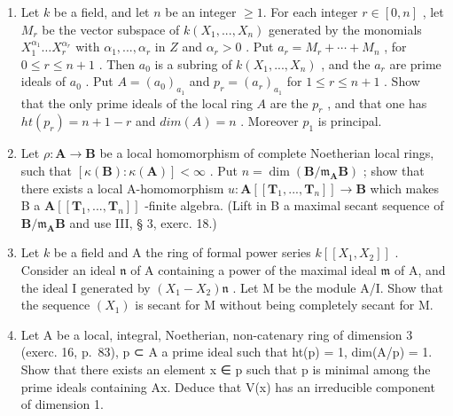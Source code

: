\begin{enumerate}
\def\labelenumi{\arabic{enumi})}
\setcounter{enumi}{3}
\item
  Let \(k\) be a field, and let \(n\) be an integer \(\geqslant 1\). For each integer \(r \in [0, n]\) , let \(M_r\) be the vector subspace of \(k(X_1, ..., X_n)\) generated by the monomials \(X_1^{\alpha_1}\ldots X_r^{\alpha_r}\) with \(\alpha_1, ..., \alpha_r\) in \(Z\) and \(\alpha_r > 0\) . Put \(a_r = M_r + \cdots + M_n\) , for \(0 \leqslant r \leqslant n + 1\) . Then \(a_0\) is a subring of \(k(X_1, ..., X_n)\) , and the \(a_r\) are prime ideals of \(a_0\) . Put \(A = (a_0)_{a_1}\) and \(p_r = (a_r)_{a_1}\) for \(1 \leqslant r \leqslant n + 1\) . Show that the only prime ideals of the local ring \(A\) are the \(p_r\) , and that one has \(ht(p_r) = n + 1 - r\) and \(dim(A) = n\) . Moreover \(p_1\) is principal.
\item
  Let \(\rho: \mathbf{A} \to \mathbf{B}\) be a local homomorphism of complete Noetherian local rings, such that \([\kappa(\mathbf{B}): \kappa(\mathbf{A})] < \infty\) . Put \(n = \dim(\mathbf{B}/\mathfrak{m}_{\mathbf{A}}\mathbf{B})\) ; show that there exists a local A-homomorphism \(u: \mathbf{A}[[\mathbf{T}_1, ..., \mathbf{T}_n]] \to \mathbf{B}\) which makes B a \(\mathbf{A}[[\mathbf{T}_1, ..., \mathbf{T}_n]]\) -finite algebra. (Lift in B a maximal secant sequence of \(\mathbf{B}/\mathfrak{m}_{\mathbf{A}}\mathbf{B}\) and use III, § 3, exerc. 18.)
\item
  Let \(k\) be a field and A the ring of formal power series \(k[[X_1, X_2]]\) . Consider an ideal \(\mathfrak{n}\) of A containing a power of the maximal ideal \(\mathfrak{m}\) of A, and the ideal I generated by \((X_1 - X_2)\mathfrak{n}\) . Let M be the module A/I. Show that the sequence \((X_1)\) is secant for M without being completely secant for M.
\item
  Let A be a local, integral, Noetherian, non-catenary ring of dimension 3 (exerc. 16, p.~83), p ⊂ A a prime ideal such that ht(p) = 1, dim(A/p) = 1. Show that there exists an element x ∈ p such that p is minimal among the prime ideals containing Ax. Deduce that V(x) has an irreducible component of dimension 1.
\end{enumerate}

